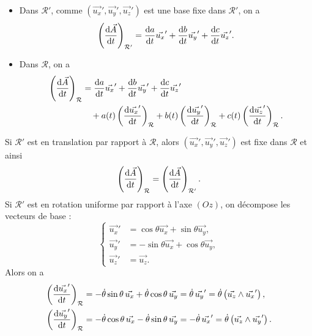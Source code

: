         \begin{itemize}
            \item Dans $\mathcal{R}'$, comme $(\vec{u_x}',\vec{u_y}',\vec{u_z}')$ est une base fixe dans $\mathcal{R}'$, on a 
            \begin{equation*}
                \left(\frac{\mathrm{d}\vec{A}}{\mathrm{d} t}\right)_{\mathcal{R}'}=\dfrac{\mathrm{d} a}{\mathrm{d} t}\vec{u_x}'+\dfrac{\mathrm{d} b}{\mathrm{d} t}\vec{u_y}'+\dfrac{\mathrm{d} c}{\mathrm{d} t}\vec{u_z}'.
            \end{equation*}
            \item Dans $\mathcal{R}$, on a 
            \begin{align*}
                \left(\frac{\mathrm{d}\vec{A}}{\mathrm{d} t}\right)_{\mathcal{R}}
                &=\frac{\mathrm{d} a}{\mathrm{d} t}\vec{u_x}'+\frac{\mathrm{d} b}{\mathrm{d} t}\vec{u_y}'+\frac{\mathrm{d} c}{\mathrm{d} t}\vec{u_z}'\\
                &\quad+a(t)\left(\frac{\mathrm{d}\vec{u_x}'}{\mathrm{d} t}\right)_{\mathcal{R}}+b(t)\left(\frac{\mathrm{d}\vec{u_y}'}{\mathrm{d} t}\right)_{\mathcal{R}}+c(t)\left(\frac{\mathrm{d}\vec{u_z}'}{\mathrm{d} t}\right)_{\mathcal{R}}.
            \end{align*}
        \end{itemize}
        Si $\mathcal{R}'$ est en translation par rapport à $\mathcal{R}$, alors $(\vec{u_x}',\vec{u_y}',\vec{u_z}')$ est fixe dans $\mathcal{R}$ et ainsi 
        \begin{equation*}
            \left(\dfrac{\mathrm{d}\vec{A}}{\mathrm{d} t}\right)_{\mathcal{R}}=\left(\dfrac{\mathrm{d}\vec{A}}{\mathrm{d} t}\right)_{\mathcal{R}'}.
        \end{equation*}
        Si $\mathcal{R}'$ est en rotation uniforme par rapport à l'axe $(Oz)$, on décompose les vecteurs de base :
        \begin{equation*}
            \left\lbrace
            \begin{aligned}
                \vec{u_x}' &= \cos\theta\vec{u_x}+\sin\theta\vec{u_y},\\
                \vec{u_y}' &= -\sin\theta\vec{u_x}+\cos\theta\vec{u_y},\\
                \vec{u_z}' &= \vec{u_z}.
            \end{aligned}
            \right.
        \end{equation*}
        Alors on a 
        \begin{equation*}
            \begin{aligned}
                \left(\frac{\mathrm{d}\vec{u_x}'}{\mathrm{d} t}\right)_{\mathcal{R}} &= -\dot{\theta}\sin\theta\,\vec{u_x}+\dot{\theta}\cos\theta\,\vec{u_y}=\dot{\theta}\,\vec{u_y}'=\dot{\theta}\left(\vec{u_z}\wedge\vec{u_x}'\right),\\
                \left(\frac{\mathrm{d}\vec{u_y}'}{\mathrm{d} t}\right)_{\mathcal{R}} &= -\dot{\theta}\cos\theta\,\vec{u_x}-\dot{\theta}\sin\theta\,\vec{u_y}=-\dot{\theta}\,\vec{u_x}'=\dot{\theta}\left(\vec{u_z}\wedge\vec{u_y}'\right).
            \end{aligned}
        \end{equation*}
